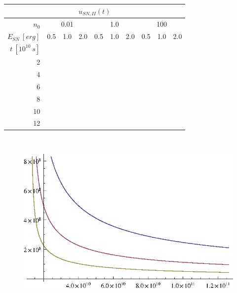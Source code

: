 \begin{tabular}{|r|l|l|l|l|l|l|l|l|l|}
\multicolumn{10}{c}{\(u_{SN,II}(t)\)}\\
\hline
\(n_0\) & \multicolumn{3}{|c|}{0.01} & \multicolumn{3}{|c|}{1.0} & \multicolumn{3}{|c|}{100}\\
\hline
\(E_{SN}~[erg]\) & 0.5 & 1.0 & 2.0 & 0.5 & 1.0 & 2.0 & 0.5 & 1.0 & 2.0\\
\hline
\(t~[10^{10}~s]\) & & & & & & & & & \\
\cline{1-1}
2 & & & & & & & & & \\
4 & & & & & & & & & \\
6 & & & & & & & & & \\
8 & & & & & & & & & \\
10 & & & & & & & & & \\
12 & & & & & & & & & \\
\hline
\end{tabular}\\
\begin{figure}[ht]
\begin{center}
\includegraphics{aufgabe6u.eps}
\end{center}
\end{figure}
